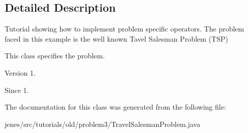 \subsection{Detailed Description}
Tutorial showing how to implement problem specific operators. The problem faced in this example is the well known Tavel Salesman Problem (T\-S\-P)

This class specifies the problem.

\begin{DoxyVersion}{Version}
1. 
\end{DoxyVersion}
\begin{DoxySince}{Since}
1. 
\end{DoxySince}


The documentation for this class was generated from the following file\-:\begin{DoxyCompactItemize}
\item 
jenes/src/tutorials/old/problem3/Travel\-Salesman\-Problem.\-java\end{DoxyCompactItemize}
